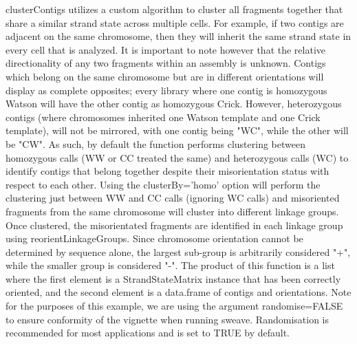 \documentclass{article}
\begin{document}
clusterContigs utilizes a custom algorithm to cluster all fragments together that share a similar strand state across multiple cells.  For example, if two contigs are adjacent on the same chromosome, then they will inherit the same strand state in every cell that is analyzed.  It is important to note however that the relative directionality of any two fragments within an assembly is unknown. Contigs which belong on the same chromosome but are in different orientations will display as complete opposites; every library where one contig is homozygous Watson will have the other contig as homozygous Crick.  However, heterozygous contigs (where chromosomes inherited one Watson template and one Crick template), will not be mirrored, with one contig being "WC", while the other will be "CW". As such, by default the function performs clustering between homozygous calls (WW or CC treated the same) and heterozygous calls (WC) to identify contigs that belong together despite their misorientation status with respect to each other. Using the clusterBy='homo' option will perform the clustering just between WW and CC calls (ignoring WC calls) and misoriented fragments from the same chromosome will cluster into different linkage groups. Once clustered, the misorientated fragments are identified in each linkage group using reorientLinkageGroups. Since chromosome orientation cannot be determined by sequence alone, the largest sub-group is arbitrarily considered "+", while the smaller group is considered "-". The product of this function is a list where the first element is a StrandStateMatrix instance that has been correctly oriented, and the second element is a data.frame of contigs and orientations. Note for the purposes of this example, we are using the argument randomise=FALSE to ensure conformity of the vignette when running sweave. Randomisation is recommended for most applications and is set to TRUE by default.
\end{document}
